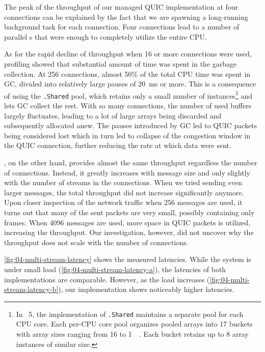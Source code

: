 The peak of the throughput of our managed QUIC implementation at four connections can be explained
by the fact that we are spawning a long-running background task for each connection. Four
connections lead to a number of parallel s that were enough to completely utilize the
entire CPU\@.

As for the rapid decline of throughput when 16 or more connections were used, profiling showed that
substantial amount of time was spent in the garbage collection. At 256 connections, almost 50\% of
the total CPU time was spent in GC, divided into relatively large pauses of \SI{20}{\milli\second}
or more. This is a consequence of using the \ArrayPoolOf{\Byte}\texttt{.Shared} pool, which retains
only a small number of \ArrayOf{\Byte} instances\footnote{In \dotnet{}~5, the implementation of
  \ArrayPoolOf{\Byte}\texttt{.Shared} maintains a separate pool for each CPU core. Each per-CPU core
  pool organizes pooled arrays into 17 buckets with array sizes ranging from \SI{16}{\byte} to
  \SI{1}{\mebi\byte}. Each bucket retains up to 8 array instances of similar size.} and lets GC
collect the rest. With so many connections, the number of used buffers largely fluctuates, leading
to a lot of large arrays being discarded and subsequently allocated anew. The pauses introduced by
GC led to QUIC packets being considered lost which in turn led to collapse of the congestion window
in the QUIC connection, further reducing the rate at which data were sent.

\libmsquic{}, on the other hand, provides almost the same throughput regardless the number of
connections. Instead, it greatly increases with message size and only slightly with the number of
streams in the connections. When we tried sending even larger messages, the total throughput did not
increase significantly anymore. Upon closer inspection of the \libmsquic{} network traffic when
\SI{256}{\byte} messages are used, it turns out that many of the sent packets are very small,
possibly containing only \ACK{} frames. When \SI{4096}{\byte} messages are used, more space in QUIC
packets is utilized, increasing the throughput. Our investigation, however, did not uncover why the
\libmsquic{} throughput does not scale with the number of connections.

\autoref{fig:04-multi-stream-latency} shows the measured latencies. While the system is under small
load (\autoref{fig:04-multi-stream-latency-a}), the latencies of both implementations are
comparable. However, as the load increases (\autoref{fig:04-multi-stream-latency-b}), our
implementation shows noticeably higher latencies.

